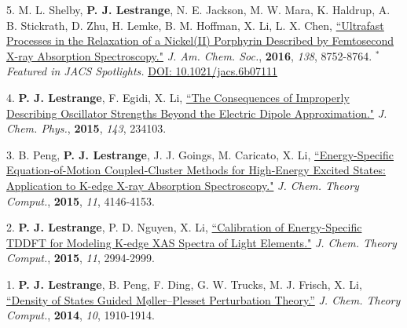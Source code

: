 \begin{cvpublications}
\cvpublication
{5.} 
{M. L. Shelby, \textbf{P. J. Lestrange}, N. E. Jackson, M. W. Mara, K. Haldrup, A. B. Stickrath, D. Zhu, H. Lemke, B. M. Hoffman, X. Li, L. X. Chen, \href{http://pubs.acs.org/doi/abs/10.1021/jacs.6b02176}{``Ultrafast Processes in the Relaxation of a Nickel(II) Porphyrin Described by Femtosecond X-ray Absorption Spectroscopy."} \textit{J. Am. Chem. Soc.}, \textbf{2016}, \textit{138}, 8752-8764. $^*$\textit{Featured in JACS Spotlights.} \href{http://pubs.acs.org/doi/abs/10.1021/jacs.6b07111}{DOI: 10.1021/jacs.6b07111}} 


\cvpublication
{4.} 
{\textbf{P. J. Lestrange}, F. Egidi, X. Li, \href{http://scitation.aip.org/content/aip/journal/jcp/143/23/10.1063/1.4937410}{``The Consequences of Improperly Describing Oscillator Strengths Beyond the Electric Dipole Approximation."} \textit{J. Chem. Phys.}, \textbf{2015}, \textit{143}, 234103.} 


\cvpublication
{3.} 
{B. Peng, \textbf{P. J. Lestrange}, J. J. Goings, M. Caricato, X. Li, \href{http://pubs.acs.org/doi/full/10.1021/acs.jctc.5b00459}{``Energy-Specific Equation-of-Motion Coupled-Cluster Methods for High-Energy Excited States: Application to K-edge X-ray Absorption Spectroscopy."} \textit{J. Chem. Theory Comput.}, \textbf{2015}, \textit{11}, 4146-4153.} 


\cvpublication
{2.} 
{\textbf{P. J. Lestrange}, P. D. Nguyen, X. Li, \href{http://pubs.acs.org/doi/abs/10.1021/acs.jctc.5b00169}{``Calibration of Energy-Specific TDDFT for Modeling K-edge XAS Spectra of Light Elements."} \textit{J. Chem. Theory Comput.}, \textbf{2015}, \textit{11}, 2994-2999.} 


\cvpublication
{1.} 
{\textbf{P. J. Lestrange}, B. Peng, F. Ding, G. W. Trucks, M. J. Frisch, X. Li, \href{http://pubs.acs.org/doi/abs/10.1021/ct400765a}{``Density of States Guided M{\o}ller--Plesset Perturbation Theory.''} \textit{J. Chem. Theory Comput.}, \textbf{2014}, \textit{10}, 1910-1914.} 


\end{cvpublications}
\vspace{-1cm}

